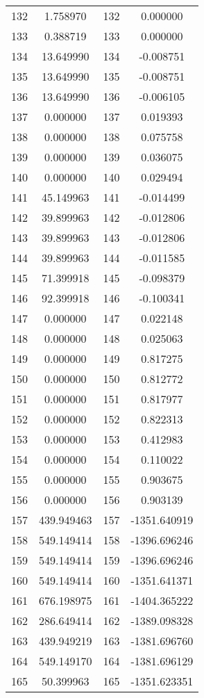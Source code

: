 \documentclass[12pt]{article}
\begin{document}
\begin{longtable}{@{}cccc@{}}
132 & 1.758970 & 132 & 0.000000 \\
133 & 0.388719 & 133 & 0.000000 \\
134 & 13.649990 & 134 & -0.008751 \\
135 & 13.649990 & 135 & -0.008751 \\
136 & 13.649990 & 136 & -0.006105 \\
137 & 0.000000 & 137 & 0.019393 \\
138 & 0.000000 & 138 & 0.075758 \\
139 & 0.000000 & 139 & 0.036075 \\
140 & 0.000000 & 140 & 0.029494 \\
141 & 45.149963 & 141 & -0.014499 \\
142 & 39.899963 & 142 & -0.012806 \\
143 & 39.899963 & 143 & -0.012806 \\
144 & 39.899963 & 144 & -0.011585 \\
145 & 71.399918 & 145 & -0.098379 \\
146 & 92.399918 & 146 & -0.100341 \\
147 & 0.000000 & 147 & 0.022148 \\
148 & 0.000000 & 148 & 0.025063 \\
149 & 0.000000 & 149 & 0.817275 \\
150 & 0.000000 & 150 & 0.812772 \\
151 & 0.000000 & 151 & 0.817977 \\
152 & 0.000000 & 152 & 0.822313 \\
153 & 0.000000 & 153 & 0.412983 \\
154 & 0.000000 & 154 & 0.110022 \\
155 & 0.000000 & 155 & 0.903675 \\
156 & 0.000000 & 156 & 0.903139 \\
157 & 439.949463 & 157 & -1351.640919 \\
158 & 549.149414 & 158 & -1396.696246 \\
159 & 549.149414 & 159 & -1396.696246 \\
160 & 549.149414 & 160 & -1351.641371 \\
161 & 676.198975 & 161 & -1404.365222 \\
162 & 286.649414 & 162 & -1389.098328 \\
163 & 439.949219 & 163 & -1381.696760 \\
164 & 549.149170 & 164 & -1381.696129 \\
165 & 50.399963 & 165 & -1351.623351 \\

\end{longtable}
\end{document}

